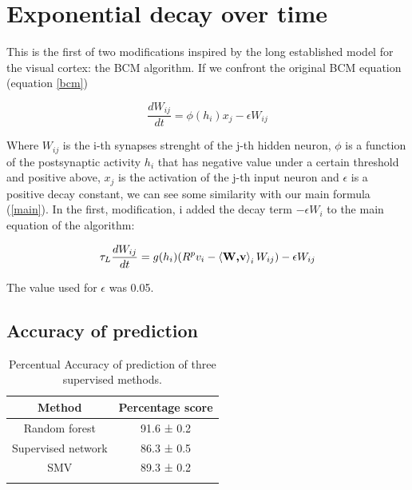 \documentclass[a4paper]{report}
\begin{document}
\section{Exponential decay over time}

This is the first of two modifications inspired by the long established model for the visual cortex: the BCM algorithm. If we confront the original BCM equation (equation \ref{bcm})

\begin{equation}
    \frac{dW_{ij}}{dt} = \phi(h_i)x_{j} - \epsilon W_{ij}
    \label{bcm}
\end{equation}

Where $W_{ij}$ is the i-th synapses strenght of the j-th hidden neuron, $\phi$ is a function of the postsynaptic activity $h_i$ that has negative value under a certain threshold and positive above, $x_{j}$ is the activation of the j-th input neuron and $\epsilon$ is a positive decay constant, we can see some similarity with our main formula (\ref{main}).
In the first, modification, i added the decay term $-\epsilon W_i$ to the main equation of the algorithm:

\begin{equation}\label{099}
    \tau_L \frac{dW_{ij}}{dt} = g(h_i)(R^p v_i - \braket{\textbf{W,v}}_i W_{ij} ) -\epsilon W_{ij}
\end{equation}

The value used for $\epsilon$ was 0.05.

\subsection{Accuracy of prediction}

\begin{table}[h!]
  \begin{center}
    \caption{Percentual Accuracy of prediction of three supervised methods.}
    \begin{tabular}{c|c} %
      \textbf{Method} & \textbf{Percentage score}\\
      \hline
      Random forest & 91.6  ± 0.2\\
      Supervised network & 86.3 ± 0.5\\
      SMV & 89.3 ± 0.2\\
        \label{decayT}
    \end{tabular}
  \end{center}
\end{table}
\end{document}
